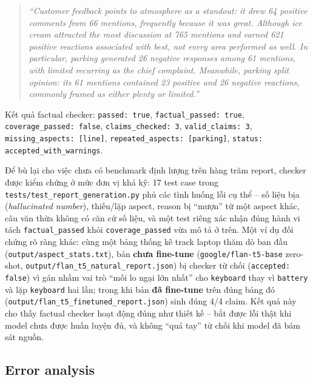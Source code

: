\documentclass[11pt,a4paper]{article}
\begin{document}
\begin{quote}
\emph{``Customer feedback points to atmosphere as a standout: it drew 64
positive comments from 66 mentions, frequently because it was great.
Although ice cream attracted the most discussion at 765 mentions and
earned 621 positive reactions associated with best, not every area
performed as well. In particular, parking generated 26 negative
responses among 61 mentions, with limited recurring as the chief
complaint. Meanwhile, parking split opinion: its 61 mentions contained
23 positive and 26 negative reactions, commonly framed as either plenty
or limited.''}
\end{quote}

Kết quả factual checker: \texttt{passed: true}, \texttt{factual\_passed:
true}, \texttt{coverage\_passed: false}, \texttt{claims\_checked: 3},
\texttt{valid\_claims: 3}, \texttt{missing\_aspects: [line]},
\texttt{repeated\_aspects: [parking]}, \texttt{status:
accepted\_with\_warnings}.

Để bù lại cho việc chưa có benchmark định lượng trên hàng trăm report,
checker được kiểm chứng ở mức đơn vị khá kỹ: 17 test case trong
\texttt{tests/\allowbreak test\_\allowbreak report\_\allowbreak generation.py} phủ các tình huống lỗi cụ thể
-- số liệu bịa (\emph{hallucinated number}), thiếu/lặp aspect, reason bị
``mượn'' từ một aspect khác, câu văn thừa không có căn cứ số liệu, và một
test riêng xác nhận đúng hành vi tách \texttt{factual\_passed} khỏi
\texttt{coverage\_passed} vừa mô tả ở trên. Một ví dụ đối chứng rõ ràng
khác: cùng một bảng thống kê track laptop thăm dò ban đầu
(\texttt{output/\allowbreak aspect\_\allowbreak stats.txt}), bản \textbf{chưa fine-tune}
(\texttt{google/\allowbreak flan-\allowbreak t5-\allowbreak base} zero-shot,
\texttt{output/\allowbreak flan\_\allowbreak t5\_\allowbreak natural\_\allowbreak report.json}) bị checker từ chối
(\texttt{accepted: false}) vì gán nhầm vai trò ``mối lo ngại lớn nhất''
cho \texttt{keyboard} thay vì \texttt{battery} và lặp \texttt{keyboard}
hai lần; trong khi bản \textbf{đã fine-tune} trên đúng bảng đó
(\texttt{output/\allowbreak flan\_\allowbreak t5\_\allowbreak finetuned\_\allowbreak report.json}) sinh đúng 4/4 claim.
Kết quả này cho thấy factual checker hoạt động đúng như thiết kế -- bắt
được lỗi thật khi model chưa được huấn luyện đủ, và không ``quá tay'' từ
chối khi model đã bám sát nguồn.

\subsection{Error analysis}
\label{sec:erroranalysis}
\end{document}

